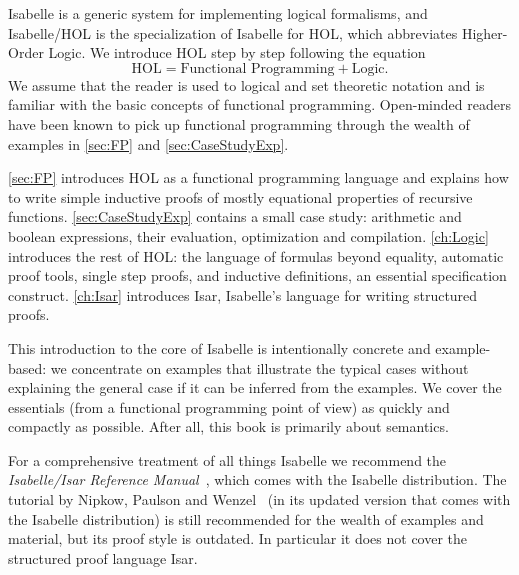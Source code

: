 Isabelle is a generic system for
implementing logical formalisms, and Isabelle/HOL is the specialization
of Isabelle for HOL, which abbreviates Higher-Order Logic. We introduce
HOL step by step following the equation
\[ \mbox{HOL} = \mbox{Functional Programming} + \mbox{Logic}. \]
We assume that the reader is used to logical and set theoretic notation
and is familiar with the basic concepts of functional programming.
\ifsem
Open-minded readers have been known to pick up functional
programming through the wealth of examples in \autoref{sec:FP}
and \autoref{sec:CaseStudyExp}.
\fi

\autoref{sec:FP} introduces HOL as a functional programming language and
explains how to write simple inductive proofs of mostly equational properties
of recursive functions.
\ifsem
\autoref{sec:CaseStudyExp} contains a
small case study: arithmetic and boolean expressions, their evaluation,
optimization and compilation.
\fi
\autoref{ch:Logic} introduces the rest of HOL: the
language of formulas beyond equality, automatic proof tools, single
step proofs, and inductive definitions, an essential specification construct.
\autoref{ch:Isar} introduces Isar, Isabelle's language for writing structured
proofs.



This introduction to the core of Isabelle is intentionally concrete and
example-based: we concentrate on examples that illustrate the typical cases
without explaining the general case if it can be inferred from the examples.
We cover the essentials (from a functional programming point of view) as
quickly and compactly as possible.
\ifsem
After all, this book is primarily about semantics.
\fi

For a comprehensive treatment of all things Isabelle we recommend the
\emph{Isabelle/Isar Reference Manual}~\cite{IsarRef}, which comes with the
Isabelle distribution.
The tutorial by Nipkow, Paulson and Wenzel~\cite{LNCS2283} (in its updated version that comes with the Isabelle distribution) is still recommended for the wealth of examples and material, but its proof style is outdated. In particular it does not cover the structured proof language Isar.


